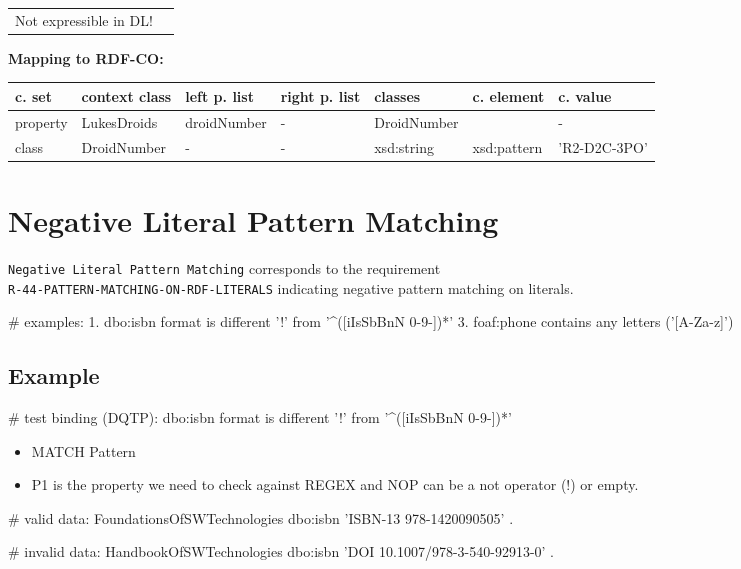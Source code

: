 \documentclass{llncs}
\newcommand{\ms}[1]{\texttt{#1}}
\newenvironment{gcotable}{
  \scriptsize
  \sffamily
  \vspace{0cm}
	\begin{center}
	\textbf{\vspace{0.4cm}Mapping to RDF-CO:} \\
  \begin{tabular}{l|l|l|l|l|l|l}
	\hline
  \textbf{c. set} & \textbf{context class} & \textbf{left p. list} & \textbf{right p. list} & \textbf{classes} & \textbf{c. element} & \textbf{c. value} \\
  \hline

}{
  \hline
  \end{tabular}
	\end{center}
}
\newenvironment{DL}{
\vspace{0cm}
	\begin{center}
  \begin{tabular}{r l}

}{
  \end{tabular}
	\end{center}
}
\begin{document}
\begin{DL}
Not expressible in DL!
\end{DL}

\begin{gcotable}
property & LukesDroids & droidNumber & - & DroidNumber &  & - \\
class & DroidNumber & - & - & xsd:string & xsd:pattern & 'R2-D2C-3PO' \\
\end{gcotable}

\section{Negative Literal Pattern Matching}

\ms{Negative Literal Pattern Matching} corresponds to the requirement \\
\ms{R-44-PATTERN-MATCHING-ON-RDF-LITERALS}
indicating negative pattern matching on literals.

\begin{ex}
# examples:
1. dbo:isbn format is different ’!’ from '^([iIsSbBnN 0-9-])*'
3. foaf:phone contains any letters ('[A-Za-z]')
\end{ex}

\subsection{Example}

\begin{ex}
# test binding (DQTP):
dbo:isbn format is different ’!’ from '^([iIsSbBnN 0-9-])*'
\end{ex}

\begin{ex}
# DQTP:
SELECT DISTINCT ?s WHERE { ?s FILTER ( \end{ex}

\begin{itemize}
	\item MATCH Pattern \cite{Kontokostas2014} 
  \item P1 is the property we need to check against REGEX and
NOP can be a not operator (!) or empty.
\end{itemize}

\begin{ex}
# valid data:
FoundationsOfSWTechnologies
    dbo:isbn 'ISBN-13 978-1420090505' .
\end{ex}

\begin{ex}
# invalid data:
HandbookOfSWTechnologies
    dbo:isbn 'DOI 10.1007/978-3-540-92913-0' .
\end{ex}
\end{document}
